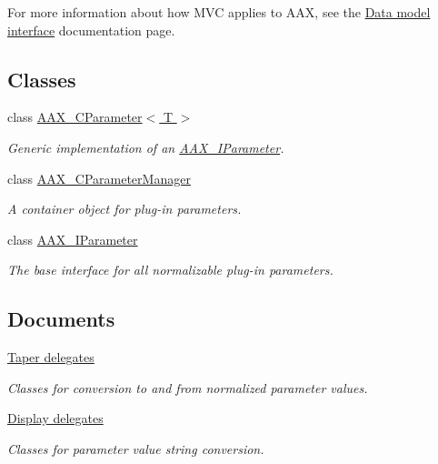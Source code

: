 For more information about how M\+V\+C applies to A\+A\+X, see the \hyperlink{a00328}{Data model interface} documentation page. \subsection*{Classes}
\begin{DoxyCompactItemize}
\item 
class \hyperlink{a00033}{A\+A\+X\+\_\+\+C\+Parameter$<$ T $>$}
\begin{DoxyCompactList}\small\item\em Generic implementation of an \hyperlink{a00108}{A\+A\+X\+\_\+\+I\+Parameter}. \end{DoxyCompactList}\item 
class \hyperlink{a00034}{A\+A\+X\+\_\+\+C\+Parameter\+Manager}
\begin{DoxyCompactList}\small\item\em A container object for plug-\/in parameters. \end{DoxyCompactList}\item 
class \hyperlink{a00108}{A\+A\+X\+\_\+\+I\+Parameter}
\begin{DoxyCompactList}\small\item\em The base interface for all normalizable plug-\/in parameters. \end{DoxyCompactList}\end{DoxyCompactItemize}
\subsection*{Documents}
\begin{DoxyCompactItemize}
\item 
\hyperlink{a00345}{Taper delegates}
\begin{DoxyCompactList}\small\item\em Classes for conversion to and from normalized parameter values. \end{DoxyCompactList}\item 
\hyperlink{a00346}{Display delegates}
\begin{DoxyCompactList}\small\item\em Classes for parameter value string conversion. \end{DoxyCompactList}\end{DoxyCompactItemize}

